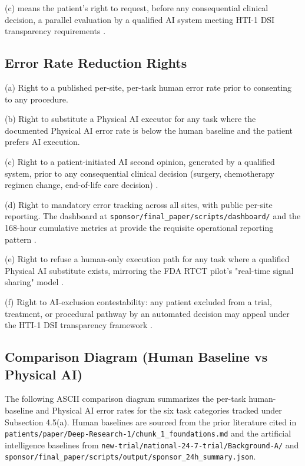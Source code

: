 (c)  means the
patient's right to request, before any consequential clinical
decision, a parallel evaluation by a qualified AI system meeting
HTI-1 DSI transparency requirements \cite{hti1_dsi_fact_sheet_2023}.

\subsection{Error Rate Reduction Rights}

\hspace{0.5cm} (a) Right to a published per-site, per-task human error rate prior
to consenting to any procedure.

(b) Right to substitute a Physical AI executor for any task where
the documented Physical AI error rate is below the human baseline
and the patient prefers AI execution.

(c) Right to a patient-initiated AI second opinion, generated by a
qualified system, prior to any consequential clinical decision
(surgery, chemotherapy regimen change, end-of-life care decision)
\cite{hti1_dsi_fact_sheet_2023}.

(d) Right to mandatory error tracking across all sites, with public
per-site reporting. The dashboard at
\texttt{sponsor/final\_paper/scripts/dashboard/} and the 168-hour
cumulative metrics at
provide the requisite operational reporting pattern
\cite{kawchak_2026_19396256}.

(e) Right to refuse a human-only execution path for any task where
a qualified Physical AI substitute exists, mirroring the FDA RTCT
pilot's "real-time signal sharing" model \cite{fda_rtct_press_2026}.

(f) Right to AI-exclusion contestability: any patient excluded from
a trial, treatment, or procedural pathway by an automated decision
may appeal under the HTI-1 DSI transparency framework
\cite{rank9_onc_hti1_2023, hti1_dsi_fact_sheet_2023}.

\subsection{Comparison Diagram (Human Baseline vs Physical AI)}

\hspace{0.5cm} The following ASCII comparison diagram summarizes the per-task
human-baseline and Physical AI error rates for the six task
categories tracked under Subsection 4.5(a). Human baselines are
sourced from the prior literature cited in
\texttt{patients/paper/Deep-Research-1/chunk\_1\_foundations.md} and
the artificial intelligence baselines from
\texttt{new-trial/national-24-7-trial/Background-A/} and
\texttt{sponsor/final\_paper/scripts/output/sponsor\_24h\_summary.json}.

